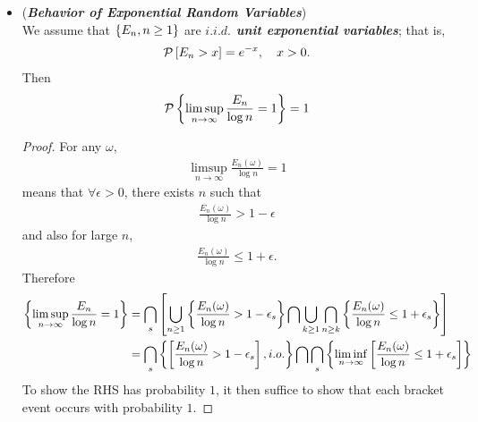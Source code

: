 \documentclass[11pt]{article}
\begin{document}
\begin{itemize}
\begin{proof}
\begin{align*}
\end{align*}
We use the inequality 
\begin{align*}
1 - x&\le \exp(-x), \quad x\in (0,1)
\end{align*}
thus \begin{align*}
\lim\limits_{m\rightarrow \infty}\prod_{n=k}^{m}\paren{1-\cP(A_{n})} &\le \lim\limits_{m\rightarrow \infty}\prod_{n=k}^{m}\exp\paren{- \cP(A_{n})}\\
&= \lim\limits_{m\rightarrow \infty}\exp\paren{- \sum_{n=k}^{m}\cP(A_{n})}\\
&= \exp(-\infty)\\
& = 0,  \text{ for all }n\le m,
\end{align*}
since $\sum_{n}\cP(A_{n})=\infty$. Therefore $\lim\limits_{k\rightarrow \infty}\lim\limits_{m\rightarrow \infty}\prod_{n=k}^{m}\paren{1-\cP(A_{n})} = 0$. \qed
\end{proof}

\item \begin{example} (\emph{\textbf{Behavior of Exponential Random Variables}}) \citep{resnick2013probability} \\
We assume that $\left\{E_{n}, n\ge 1\right\}$ are \emph{\textbf{$i.i.d.$ unit exponential variables}}; that is,
\begin{align*}
{\mathcal P}\left[E_{n} >x\right] = e^{-x}, \quad x>0.
\end{align*}
Then 
\begin{align*}
{\mathcal P}\left\{\limsup\limits_{n\rightarrow \infty}\frac{E_{n}}{\log n}= 1\right\} = 1
\end{align*}
\end{example}
\begin{proof}
For any $\omega$, 
\begin{align*}
\limsup\limits_{n\rightarrow \infty}\frac{E_{n}(\omega)}{\log n}= 1
\end{align*}
means that $\forall \epsilon>0$, there exists $n$ such that 
\begin{align*}
\frac{E_{n}(\omega)}{\log n}>  1-\epsilon
\end{align*}
and also for large $n$, 
\begin{align*}
\frac{E_{n}(\omega)}{\log n} \le   1+\epsilon.
\end{align*}
Therefore 
\begin{align*}
\left\{\limsup\limits_{n\rightarrow \infty}\frac{E_{n}}{\log n}= 1\right\} &= \bigcap_{s}\left[ \bigcup_{n\ge 1}\left\{\frac{E_{n}(\omega)}{\log n}>  1-\epsilon_{s}\right\} \bigcap \bigcup_{k\ge 1}\bigcap_{n\ge k}\left\{\frac{E_{n}(\omega)}{\log n}\le  1+\epsilon_{s}\right\} \right]\\
&=  \bigcap_{s}\left\{\left[\frac{E_{n}(\omega)}{\log n}>  1-\epsilon_{s}\right], i.o.\right\} \bigcap \bigcap_{s}\left\{\liminf\limits_{n\rightarrow \infty}\left[\frac{E_{n}(\omega)}{\log n}\le  1+\epsilon_{s}\right]\right\} 
\end{align*}
To show the RHS has probability $1$, it then suffice to show that each bracket event occurs with probability $1$. 


\end{proof}
\end{itemize}
\end{document}
